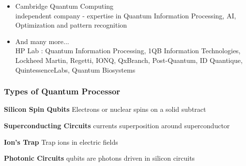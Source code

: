 \documentclass[xcolor=x11names,table]{beamer}
\begin{document}
\begin{frame}[allowframebreaks]
\begin{itemize}
			\\ {\scriptsize
				goal - bring study and applications to the next level, platform for connectivity, computing and information security
			}
			\item Cambridge Quantum Computing
			\\ {\scriptsize
				independent company - expertise in Quantum Information Processing, AI, Optimization and pattern recognition
			}
			\item And many more...
			\\ {\scriptsize
				HP Lab : Quantum Information Processing, 1QB Information Technologies, Lockheed Martin, Regetti, IONQ, QxBranch, Post-Quantum, ID Quantique, QuintessenceLabs, Quantum Biosystems
			}
		\end{itemize}
	\end{frame}
	
	\begin{frame}
		\frametitle{Types of Quantum Processor}
		\begin{block}{\textbf{Silicon Spin Qubits}}
			Electrons or nuclear spins on a solid subtract
		\end{block}
		\begin{block}{\textbf{Superconducting Circuits}}
			currents superposition around superconductor
		\end{block}
		\begin{block}{\textbf{Ion's Trap}}
			Trap ions in electric fields
		\end{block}
		\begin{block}{\textbf{Photonic Circuits}}
			qubits are photons driven in silicon circuits
		\end{block}
	\end{frame}
	
\end{document}
